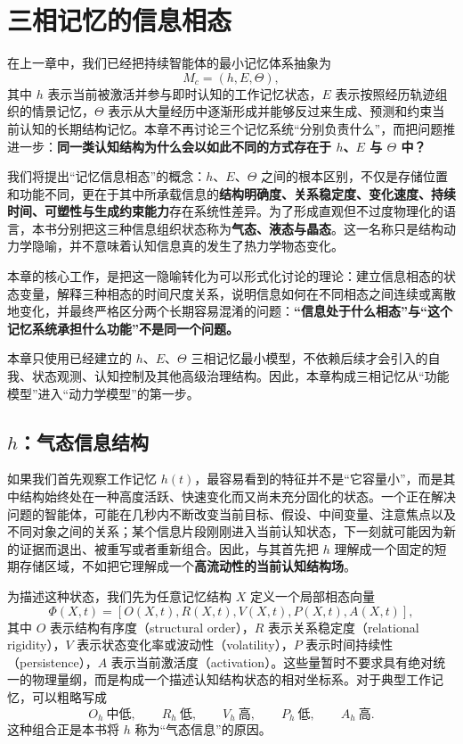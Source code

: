 \chapter{三相记忆的信息相态}

\begin{chapterlead}
在上一章中，我们已经把持续智能体的最小记忆体系抽象为
\[
M_c=(h,E,\Theta),
\]
其中 $h$ 表示当前被激活并参与即时认知的工作记忆状态，$E$ 表示按照经历轨迹组织的情景记忆，$\Theta$ 表示从大量经历中逐渐形成并能够反过来生成、预测和约束当前认知的长期结构记忆。本章不再讨论三个记忆系统“分别负责什么”，而把问题推进一步：\textbf{同一类认知结构为什么会以如此不同的方式存在于 $h$、$E$ 与 $\Theta$ 中？}

我们将提出“记忆信息相态”的概念：$h$、$E$、$\Theta$ 之间的根本区别，不仅是存储位置和功能不同，更在于其中所承载信息的\textbf{结构明确度、关系稳定度、变化速度、持续时间、可塑性与生成约束能力}存在系统性差异。为了形成直观但不过度物理化的语言，本书分别把这三种信息组织状态称为\textbf{气态、液态与晶态}。这一名称只是结构动力学隐喻，并不意味着认知信息真的发生了热力学物态变化。

本章的核心工作，是把这一隐喻转化为可以形式化讨论的理论：建立信息相态的状态变量，解释三种相态的时间尺度关系，说明信息如何在不同相态之间连续或离散地变化，并最终严格区分两个长期容易混淆的问题：\textbf{“信息处于什么相态”与“这个记忆系统承担什么功能”不是同一个问题。}

本章只使用已经建立的 $h$、$E$、$\Theta$ 三相记忆最小模型，不依赖后续才会引入的自我、状态观测、认知控制及其他高级治理结构。因此，本章构成三相记忆从“功能模型”进入“动力学模型”的第一步。
\end{chapterlead}


\section{$h$：气态信息结构}

如果我们首先观察工作记忆 $h(t)$，最容易看到的特征并不是“它容量小”，而是其中结构始终处在一种高度活跃、快速变化而又尚未充分固化的状态。一个正在解决问题的智能体，可能在几秒内不断改变当前目标、假设、中间变量、注意焦点以及不同对象之间的关系；某个信息片段刚刚进入当前认知状态，下一刻就可能因为新的证据而退出、被重写或者重新组合。因此，与其首先把 $h$ 理解成一个固定的短期存储区域，不如把它理解成一个\textbf{高流动性的当前认知结构场}。

为描述这种状态，我们先为任意记忆结构 $X$ 定义一个局部相态向量
\[
\Phi(X,t)
=
\left[
O(X,t),
R(X,t),
V(X,t),
P(X,t),
A(X,t)
\right],
\]
其中 $O$ 表示结构有序度（structural order），$R$ 表示关系稳定度（relational rigidity），$V$ 表示状态变化率或波动性（volatility），$P$ 表示时间持续性（persistence），$A$ 表示当前激活度（activation）。这些量暂时不要求具有绝对统一的物理量纲，而是构成一个描述认知结构状态的相对坐标系。对于典型工作记忆，可以粗略写成
\[
O_h \ \text{中低},\qquad
R_h \ \text{低},\qquad
V_h \ \text{高},\qquad
P_h \ \text{低},\qquad
A_h \ \text{高}.
\]
这种组合正是本书将 $h$ 称为“气态信息”的原因。

